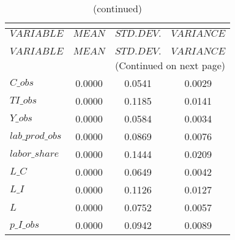  
\begin{center}
\begin{longtable}{lccc} 
\caption{THEORETICAL MOMENTS}\\
 \label{Table:th_moments}\\
\toprule 
$VARIABLE        $	 & 	 $         MEAN$	 & 	 $    STD. DEV.$	 & 	 $     VARIANCE$\\
\midrule \endfirsthead 
\caption{(continued)}\\
 \toprule \\ 
$VARIABLE        $	 & 	 $         MEAN$	 & 	 $    STD. DEV.$	 & 	 $     VARIANCE$\\
\midrule \endhead 
\midrule \multicolumn{4}{r}{(Continued on next page)} \\ \bottomrule \endfoot 
\bottomrule \endlastfoot 
$C\_obs          $	 & 	       0.0000	 & 	       0.0541	 & 	       0.0029 \\ 
$TI\_obs         $	 & 	       0.0000	 & 	       0.1185	 & 	       0.0141 \\ 
$Y\_obs          $	 & 	       0.0000	 & 	       0.0584	 & 	       0.0034 \\ 
$lab\_prod\_obs  $	 & 	       0.0000	 & 	       0.0869	 & 	       0.0076 \\ 
$labor\_share    $	 & 	       0.0000	 & 	       0.1444	 & 	       0.0209 \\ 
$L\_C            $	 & 	       0.0000	 & 	       0.0649	 & 	       0.0042 \\ 
$L\_I            $	 & 	       0.0000	 & 	       0.1126	 & 	       0.0127 \\ 
$L               $	 & 	       0.0000	 & 	       0.0752	 & 	       0.0057 \\ 
$p\_I\_obs       $	 & 	       0.0000	 & 	       0.0942	 & 	       0.0089 \\ 
\end{longtable}
 \end{center}

